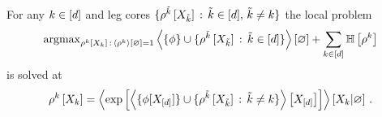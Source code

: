 \begin{theorem}
    For any $k\in[d]$ and leg cores $\{\rho^{\tilde{k}}\left[X_{\tilde{k}}\right] \, : \, \tilde{k}\in[d],\,\tilde{k}\neq k\}$ the local problem
    \begin{align*}
        \mathrm{argmax}_{\rho^{k}\left[X_{k}\right] \, : \, \left\langle \rho^{k}\right\rangle \left[ \varnothing \right]=1} \left\langle \{\phi\} \cup \{\rho^{\tilde{k}}\left[X_{\tilde{k}}\right] \, : \, \tilde{k}\in[d]\}\right\rangle \left[ \varnothing \right]
        + \sum_{k\in[d]} \mathbb{H}\left[\rho^{k}\right]
    \end{align*}
    is solved at
    \begin{align*}
        \rho^{k}\left[X_{k}\right]
        = \left\langle  \mathrm{exp}\left[ \left\langle  \{\phi[X_{[d]}] \}\cup
        \{\rho^{\tilde{k}}\left[X_{\tilde{k}}\right] \, : \, \tilde{k}\neq k\} \right\rangle \left[ X_{[d]} \right] \right]
        \right\rangle \left[ X_{k} | \varnothing \right] \, .
    \end{align*}
\end{theorem}
